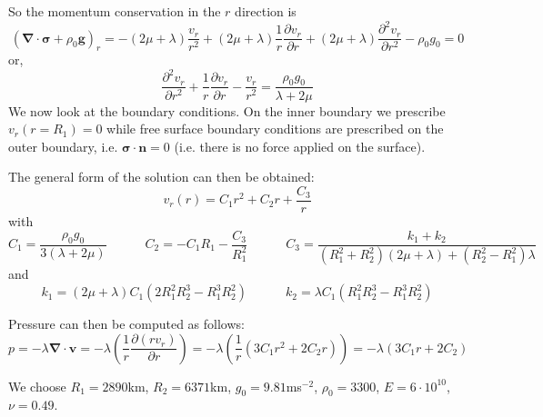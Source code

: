 So the momentum conservation in the $r$ direction is
\begin{equation}
({\bm \nabla}\cdot {\bm \sigma} + \rho_0 {\bm g})_r 
= 
-(2\mu+\lambda)\frac{v_r}{r^2} 
+(2\mu+\lambda)\frac{1}{r}\frac{\partial v_r}{\partial r}  
+(2\mu+\lambda)\frac{\partial^2 v_r}{\partial r^2} 
-\rho_0 g_0 =0
\end{equation}
or, 
\begin{equation}
\boxed{
\frac{\partial^2 v_r}{\partial r^2} 
+\frac{1}{r}\frac{\partial v_r}{\partial r}  
-\frac{v_r}{r^2} 
=\frac{\rho_0 g_0}{\lambda+2\mu}
}
\end{equation}
We now look at the boundary conditions. On the inner boundary we prescribe $v_r(r=R_1)=0$ while free
surface boundary conditions are prescribed on the outer boundary, i.e. ${\bm \sigma}\cdot{\bm n}=0$
(i.e. there is no force applied on the surface).

The general form of the solution can then be obtained:
\begin{equation}
v_r(r)=C_1 r^2 + C_2 r + \frac{C_3}{r}
\end{equation}
with 
\begin{equation}
C_1=\frac{\rho_0 g_0}{3(\lambda+2\mu)}
\quad
\quad
\quad
C_2=-C_1 R_1-\frac{C_3}{R_1^2}
\quad
\quad
\quad
C_3=\frac{k_1+k_2}{(R_1^2+R_2^2)(2\mu+\lambda)+(R_2^2-R_1^2)\lambda}
\end{equation}
and
\begin{equation}
k_1=(2\mu+\lambda) C_1 (2 R_1^2  R_2^3 - R_1^3  R_2^2)
\quad
\quad
\quad
k_2 = \lambda  C_1 (R_1^2  R_2^3 - R_1^3  R_2^2)
\end{equation}

Pressure can then be computed as follows: 
\begin{equation}
p=-\lambda {\bm \nabla}\cdot {\bm v}
= -\lambda \left( \frac{1}{r} \frac{\partial (r v_r)}{\partial r} \right)
= -\lambda \left( \frac{1}{r} ( 3C_1r^2 + 2C_2r  )\right)
= -\lambda ( 3C_1r + 2C_2  )
\end{equation}

We choose $R_1=2890$km, $R_2=6371$km, $g_0=9.81$ms$^{-2}$, $\rho_0=3300$, 
$E=6\cdot10^{10}$, $\nu=0.49$.

